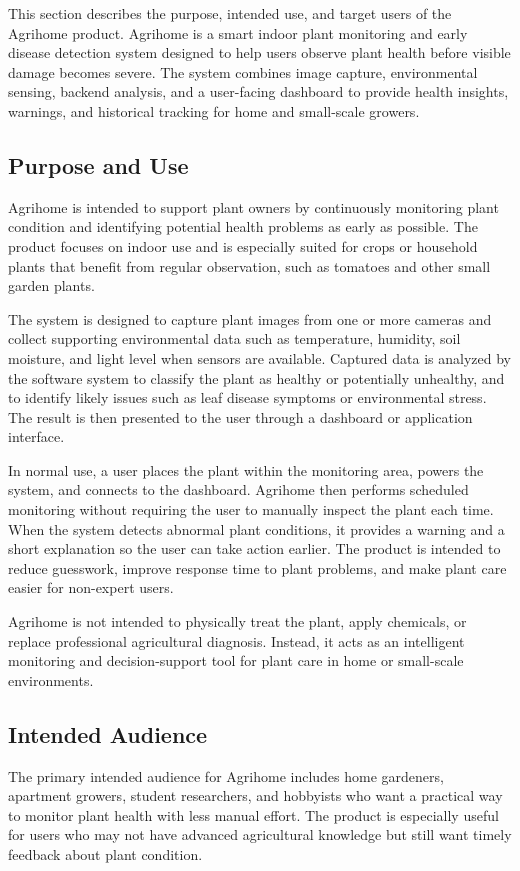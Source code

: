 This section describes the purpose, intended use, and target users of the Agrihome product. Agrihome is a smart indoor plant monitoring and early disease detection system designed to help users observe plant health before visible damage becomes severe. The system combines image capture, environmental sensing, backend analysis, and a user-facing dashboard to provide health insights, warnings, and historical tracking for home and small-scale growers.

\subsection{Purpose and Use}
Agrihome is intended to support plant owners by continuously monitoring plant condition and identifying potential health problems as early as possible. The product focuses on indoor use and is especially suited for crops or household plants that benefit from regular observation, such as tomatoes and other small garden plants.

The system is designed to capture plant images from one or more cameras and collect supporting environmental data such as temperature, humidity, soil moisture, and light level when sensors are available. Captured data is analyzed by the software system to classify the plant as healthy or potentially unhealthy, and to identify likely issues such as leaf disease symptoms or environmental stress. The result is then presented to the user through a dashboard or application interface.

In normal use, a user places the plant within the monitoring area, powers the system, and connects to the dashboard. Agrihome then performs scheduled monitoring without requiring the user to manually inspect the plant each time. When the system detects abnormal plant conditions, it provides a warning and a short explanation so the user can take action earlier. The product is intended to reduce guesswork, improve response time to plant problems, and make plant care easier for non-expert users.

Agrihome is not intended to physically treat the plant, apply chemicals, or replace professional agricultural diagnosis. Instead, it acts as an intelligent monitoring and decision-support tool for plant care in home or small-scale environments.

\subsection{Intended Audience}
The primary intended audience for Agrihome includes home gardeners, apartment growers, student researchers, and hobbyists who want a practical way to monitor plant health with less manual effort. The product is especially useful for users who may not have advanced agricultural knowledge but still want timely feedback about plant condition.

